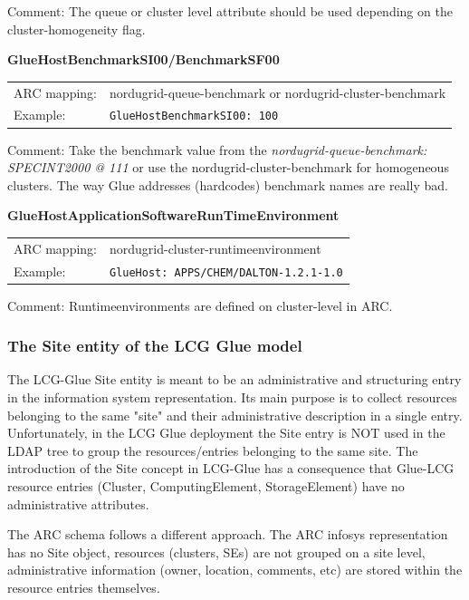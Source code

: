 \documentclass{article}
\begin{document}
Comment: The queue or cluster level attribute should be used depending on the 
cluster-homogeneity flag.
 
 
\hspace*{0.5cm}
\begin{shaded}
 \textbf{GlueHostBenchmarkSI00/BenchmarkSF00} 
\end{shaded}
\begin{tabular}{lp{10cm}}  
  ARC mapping:& nordugrid-queue-benchmark or nordugrid-cluster-benchmark\\
  Example:& \verb#GlueHostBenchmarkSI00: 100#\\
\end{tabular}

Comment: Take the benchmark value  from the 
{\it nordugrid-queue-benchmark: SPECINT2000 @ 111}
or use the nordugrid-cluster-benchmark for homogeneous clusters.
The way Glue addresses (hardcodes) benchmark names are really bad.


\hspace*{0.5cm}
\begin{shaded}
 \textbf{GlueHostApplicationSoftwareRunTimeEnvironment}
\end{shaded}
\begin{tabular}{lp{10cm}}  
  ARC mapping:& nordugrid-cluster-runtimeenvironment\\
  Example:& \verb#GlueHost: APPS/CHEM/DALTON-1.2.1-1.0#\\
\end{tabular}

Comment: Runtimeenvironments are defined on cluster-level in ARC.
 
 
\subsubsection{The Site entity of the LCG Glue model}


The LCG-Glue Site entity is meant to be an administrative and structuring
entry in the information system representation. Its main purpose is to collect
resources belonging to the same "site" and their administrative description 
in a single entry. Unfortunately, in the LCG Glue deployment the Site entry is
NOT used in the LDAP tree to group the resources/entries 
belonging to the same site. The introduction of the 
Site concept in LCG-Glue has a consequence that
Glue-LCG resource entries (Cluster, ComputingElement, StorageElement) 
have no administrative attributes.

The ARC schema follows a different approach.
The ARC infosys representation has no Site object, resources (clusters, SEs) 
are not grouped on a site level, administrative information 
(owner, location, comments, etc) are stored within the resource entries 
themselves.
\end{document}
